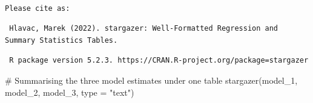 \documentclass[
  letterpaper,
  DIV=11,
  numbers=noendperiod]{scrreprt}
\newenvironment{Shaded}{\begin{snugshade}}{\end{snugshade}}
\newcommand{\AttributeTok}[1]{\textcolor[rgb]{0.40,0.45,0.13}{#1}}
\newcommand{\CommentTok}[1]{\textcolor[rgb]{0.37,0.37,0.37}{#1}}
\newcommand{\FunctionTok}[1]{\textcolor[rgb]{0.28,0.35,0.67}{#1}}
\newcommand{\NormalTok}[1]{\textcolor[rgb]{0.00,0.23,0.31}{#1}}
\newcommand{\StringTok}[1]{\textcolor[rgb]{0.13,0.47,0.30}{#1}}
\begin{document}
\begin{verbatim}

Please cite as: 
\end{verbatim}

\begin{verbatim}
 Hlavac, Marek (2022). stargazer: Well-Formatted Regression and Summary Statistics Tables.
\end{verbatim}

\begin{verbatim}
 R package version 5.2.3. https://CRAN.R-project.org/package=stargazer 
\end{verbatim}

\begin{Shaded}
\begin{Highlighting}[]
\CommentTok{\# Summarising the three model estimates under one table}
\FunctionTok{stargazer}\NormalTok{(model\_1, model\_2, model\_3, }\AttributeTok{type =} \StringTok{"text"}\NormalTok{)}
\end{Highlighting}
\end{Shaded}
\end{document}
